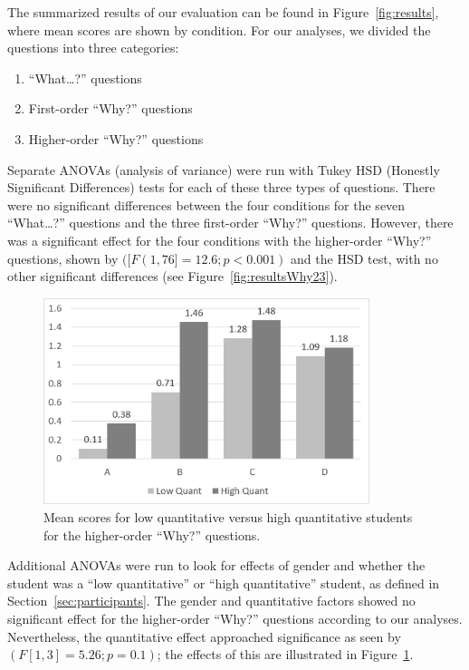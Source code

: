 The summarized results of our evaluation can be found in Figure~\ref{fig:results}, where mean scores are shown by condition.  For our analyses, we divided the questions into three categories:
\begin{enumerate}
\item ``What\ldots?'' questions
\item First-order ``Why?'' questions
\item Higher-order ``Why?'' questions
\end{enumerate}
Separate ANOVAs (analysis of variance) were run with Tukey HSD (Honestly Significant Differences) tests for each of these three types of questions.  There were no significant differences between the four conditions for the seven ``What\ldots?'' questions and the three first-order ``Why?'' questions.    However, there was a significant effect for the four conditions with the higher-order ``Why?'' questions, shown by $([F(1, 76] = 12.6; p < 0.001)$ and the HSD test, with no other significant differences (see Figure~\ref{fig:resultsWhy23}).

\begin{figure}[h]
	\centering
	\includegraphics[width=0.85\textwidth]{figures/png/results_arts_science.png}
	\caption[Mean scores for low quantitative versus high quantitative students for the higher-order ``Why?'' questions]{Mean scores for low quantitative versus high quantitative students for the higher-order ``Why?'' questions.}
	\label{fig:results_arts_science}
\end{figure}

Additional ANOVAs were run to look for effects of gender and whether the student was a ``low quantitative'' or ``high quantitative'' student, as defined in Section~\ref{sec:participants}.  The gender and quantitative factors showed no significant effect for the higher-order ``Why?'' questions according to our analyses.  Nevertheless, the quantitative effect approached significance as seen by $(F[1, 3] = 5.26; p = 0.1)$; the effects of this are illustrated in Figure~\ref{fig:results_arts_science}.

